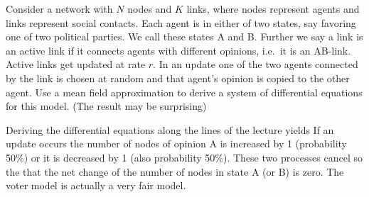 
Consider a network with $N$ nodes and $K$ links, where nodes represent agents and links represent social contacts. Each agent is in either of two states, say favoring one of two political parties. We call these states A and B. Further we say a link is an active link if it connects agents with different opinions, i.e.~it is an AB-link. Active links get updated at rate $r$. In an update one of the two agents connected by the link is chosen at random and that agent's opinion is copied to the other agent. Use a mean field approximation to derive a system of differential equations for this model. (The result may be surprising)  

\solution
Deriving the differential equations along the lines of the lecture yields
If an update occurs the number of nodes of opinion A is increased by 1 (probability 50\%) or it is decreased by 1 (also probability 50\%). These two processes cancel so the that the net change of the number of nodes in state A (or B) is zero. The voter model is actually a very fair model. 
